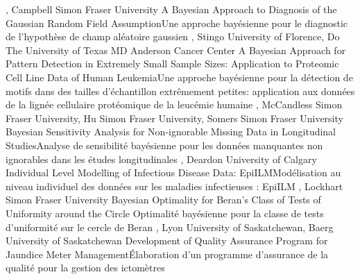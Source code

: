 {
,  {Campbell}
{Simon Fraser University}
}
{A Bayesian Approach to Diagnosis of the Gaussian Random Field Assumption}{Une approche bayésienne pour le diagnostic de l’hypothèse de champ aléatoire gaussien}
{\bubbleE \enspace \screenE}
{
,  {Stingo}
{University of Florence},  {Do}
{The University of Texas MD Anderson Cancer Center}
}
{A Bayesian Approach for Pattern Detection in Extremely Small Sample Sizes: Application to Proteomic Cell Line Data of Human Leukemia}{Une approche bayésienne pour la détection de motifs dans des tailles d'échantillon extrêmement petites: application aux données de la lignée cellulaire protéomique de la leucémie humaine}
{\bubbleE \enspace \screenE}
{
,  {McCandless}
{Simon Fraser University},  {Hu}
{Simon Fraser University},  {Somers}
{Simon Fraser University}
}
{Bayesian Sensitivity Analysis for Non-ignorable Missing Data in Longitudinal Studies}{Analyse de sensibilité bayésienne pour les données manquantes non ignorables dans les études longitudinales}
{\bubbleE \enspace \screenE}
{
,  {Deardon}
{University of Calgary}
}
{Individual Level Modelling of Infectious Disease Data: EpiILM}{Modélisation au niveau individuel des données sur les maladies infectieuses : EpiILM}
{\bubbleE \enspace \screenE}
{
,  {Lockhart}
{Simon Fraser University}
}
{ Bayesian Optimality for Beran's Class of Tests of Uniformity around the Circle}{ Optimalité bayésienne pour la classe de tests d’uniformité sur le cercle de Beran}
{\bubbleE \enspace \screenE}
{
,  {Lyon}
{University of Saskatchewan},  {Baerg}
{University of Saskatchewan}
}
{Development of Quality Assurance Program for Jaundice Meter Management}{Élaboration d’un programme d’assurance de la qualité pour la gestion des ictomètres}
{\bubbleE \enspace \screenE}


